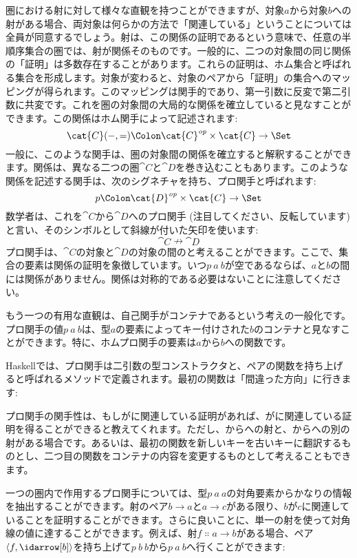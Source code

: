 
\lettrine[lhang=0.17]{圏}{における}射に対して様々な直観を持つことができますが、対象$a$から対象$b$への射がある場合、両対象は何らかの方法で「関連している」ということについては全員が同意するでしょう。射は、この関係の証明であるという意味で、任意の半順序集合の圏では、射が関係そのものです。一般的に、二つの対象間の同じ関係の「証明」は多数存在することがあります。これらの証明は、ホム集合と呼ばれる集合を形成します。対象が変わると、対象のペアから「証明」の集合へのマッピングが得られます。このマッピングは関手的であり、第一引数に反変で第二引数に共変です。これを圏の対象間の大局的な関係を確立していると見なすことができます。この関係はホム関手によって記述されます: 
\[\cat{C}(-, =) \Colon \cat{C}^\mathit{op}\times{}\cat{C} \to \Set\]
一般に、このような関手は、圏の対象間の関係を確立すると解釈することができます。関係は、異なる二つの圏$\cat{C}$と$\cat{D}$を巻き込むこともあります。このような関係を記述する関手は、次のシグネチャを持ち、プロ関手と呼ばれます: 
\[p \Colon \cat{D}^\mathit{op}\times{}\cat{C} \to \Set\]
数学者は、これを$\cat{C}$から$\cat{D}$へのプロ関手 (注目してください、反転しています) と言い、そのシンボルとして斜線が付いた矢印を使います: 
\[\cat{C} \nrightarrow \cat{D}\]
プロ関手は、$\cat{C}$の対象と$\cat{D}$の対象の間のと考えることができます。ここで、集合の要素は関係の証明を象徴しています。いつ$p\ a\ b$が空であるならば、$a$と$b$の間には関係がありません。関係は対称的である必要はないことに注意してください。

もう一つの有用な直観は、自己関手がコンテナであるという考えの一般化です。プロ関手の値$p\ a\ b$は、型$a$の要素によってキー付けされた$b$のコンテナと見なすことができます。特に、ホムプロ関手の要素は$a$から$b$への関数です。

Haskellでは、プロ関手は二引数の型コンストラクタと、ペアの関数を持ち上げると呼ばれるメソッドで定義されます。最初の関数は「間違った方向」に行きます: 

プロ関手の関手性は、もしがに関連している証明があれば、がに関連している証明を得ることができると教えてくれます。ただし、からへの射と、からへの別の射がある場合です。あるいは、最初の関数を新しいキーを古いキーに翻訳するものとし、二つ目の関数をコンテナの内容を変更するものとして考えることもできます。

一つの圏内で作用するプロ関手については、型$p\ a\ a$の対角要素からかなりの情報を抽出することができます。射のペア$b \to a$と$a \to c$がある限り、$b$が$c$に関連していることを証明することができます。さらに良いことに、単一の射を使って対角線の値に達することができます。例えば、射$f \Colon a \to b$がある場合、ペア$\langle f, \idarrow[b] \rangle$を持ち上げて$p\ b\ b$から$p\ a\ b$へ行くことができます: 

